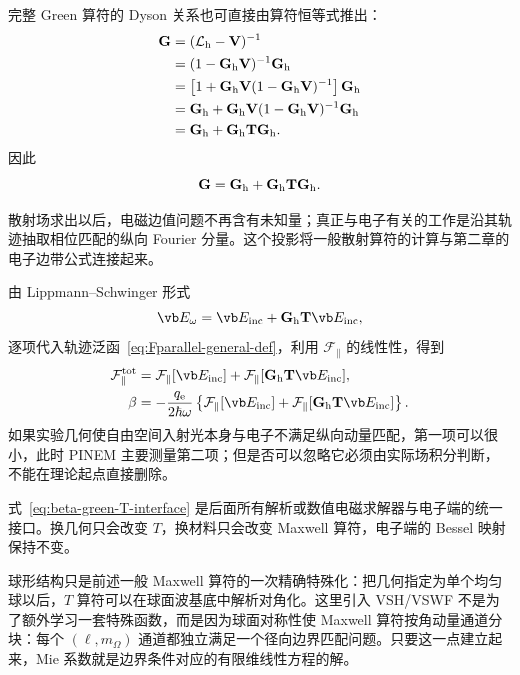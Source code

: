完整 Green 算符的 Dyson 关系也可直接由算符恒等式推出：
\begin{align}
\mathbf G
&=(\mathcal L_{\rm h}-\mathbf V)^{-1}\\
&=(1-\mathbf G_{\rm h}\mathbf V)^{-1}\mathbf G_{\rm h}\\
&=\left[1+\mathbf G_{\rm h}\mathbf V(1-\mathbf G_{\rm h}\mathbf V)^{-1}\right]\mathbf G_{\rm h}\\
&=\mathbf G_{\rm h}
+\mathbf G_{\rm h}\mathbf V(1-\mathbf G_{\rm h}\mathbf V)^{-1}\mathbf G_{\rm h}\\
&=\mathbf G_{\rm h}+\mathbf G_{\rm h}\mathbf T\mathbf G_{\rm h}.
\end{align}
因此
\begin{equation}
{
\mathbf G=\mathbf G_{\rm h}+\mathbf G_{\rm h}\mathbf T\mathbf G_{\rm h}.}
\label{eq:Dyson_T}
\end{equation}


散射场求出以后，电磁边值问题不再含有未知量；真正与电子有关的工作是沿其轨迹抽取相位匹配的纵向 Fourier 分量。这个投影将一般散射算符的计算与第二章的电子边带公式连接起来。

由 Lippmann--Schwinger 形式
\begin{equation}
\vb E_\omega=\vb E_{\rm inc}+\mathbf G_{\rm h}\mathbf T\vb E_{\rm inc},
\end{equation}
逐项代入轨迹泛函~\cref{eq:Fparallel-general-def}，利用 $\mathcal F_{\parallel}$ 的线性性，得到
\begin{align}
\mathcal F_{\parallel}^{\rm tot}
&=\mathcal F_{\parallel}[\vb E_{\rm inc}]
 +\mathcal F_{\parallel}[\mathbf G_{\rm h}\mathbf T\vb E_{\rm inc}],\\
\beta
&=-\frac{q_{\rm e}}{2\hbar\omega}
\left\{
\mathcal F_{\parallel}[\vb E_{\rm inc}]
+\mathcal F_{\parallel}[\mathbf G_{\rm h}\mathbf T\vb E_{\rm inc}]
\right\}.
\label{eq:beta-green-T-interface}
\end{align}
如果实验几何使自由空间入射光本身与电子不满足纵向动量匹配，第一项可以很小，此时 PINEM 主要测量第二项；但是否可以忽略它必须由实际场积分判断，不能在理论起点直接删除。

式~\cref{eq:beta-green-T-interface} 是后面所有解析或数值电磁求解器与电子端的统一接口。换几何只会改变 $T$，换材料只会改变 Maxwell 算符，电子端的 Bessel 映射保持不变。


球形结构只是前述一般 Maxwell 算符的一次精确特殊化：把几何指定为单个均匀球以后，$T$ 算符可以在球面波基底中解析对角化。这里引入 VSH/VSWF 不是为了额外学习一套特殊函数，而是因为球面对称性使 Maxwell 算符按角动量通道分块：每个 $(\ell,m_\Omega)$ 通道都独立满足一个径向边界匹配问题。只要这一点建立起来，Mie 系数就是边界条件对应的有限维线性方程的解。

